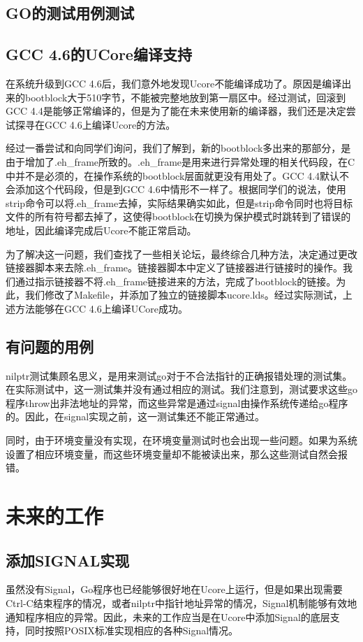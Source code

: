 \documentclass{article}
\begin{document}
\subsection{GO的测试用例测试}

\subsection{GCC 4.6的UCore编译支持}
在系统升级到GCC 4.6后，我们意外地发现Ucore不能编译成功了。原因是编译出来的bootblock大于510字节，不能被完整地放到第一扇区中。经过测试，回滚到GCC 4.4是能够正常编译的，但是为了能在未来使用新的编译器，我们还是决定尝试探寻在GCC 4.6上编译Ucore的方法。

经过一番尝试和向同学们询问，我们了解到，新的bootblock多出来的那部分，是由于增加了.eh\_frame所致的。.eh\_frame是用来进行异常处理的相关代码段，在C中并不是必须的，在操作系统的bootblock层面就更没有用处了。GCC 4.4默认不会添加这个代码段，但是到GCC 4.6中情形不一样了。根据同学们的说法，使用strip命令可以将.eh\_frame去掉，实际结果确实如此，但是strip命令同时也将目标文件的所有符号都去掉了，这使得bootblock在切换为保护模式时跳转到了错误的地址，因此编译完成后Ucore不能正常启动。

为了解决这一问题，我们查找了一些相关论坛，最终综合几种方法，决定通过更改链接器脚本来去除.eh\_frame。链接器脚本中定义了链接器进行链接时的操作。我们通过指示链接器不将.eh\_frame链接进来的方法，完成了bootblock的链接。为此，我们修改了Makefile，并添加了独立的链接脚本ucore.lds。经过实际测试，上述方法能够在GCC 4.6上编译UCore成功。

\subsection{有问题的用例}
nilptr测试集顾名思义，是用来测试go对于不合法指针的正确报错处理的测试集。在实际测试中，这一测试集并没有通过相应的测试。我们注意到，测试要求这些go程序throw出非法地址的异常，而这些异常是通过signal由操作系统传递给go程序的。因此，在signal实现之前，这一测试集还不能正常通过。

同时，由于环境变量没有实现，在环境变量测试时也会出现一些问题。如果为系统设置了相应环境变量，而这些环境变量却不能被读出来，那么这些测试自然会报错。

\section{未来的工作}

\subsection{添加SIGNAL实现}
虽然没有Signal，Go程序也已经能够很好地在Ucore上运行，但是如果出现需要Ctrl-C结束程序的情况，或者nilptr中指针地址异常的情况，Signal机制能够有效地通知程序相应的异常。因此，未来的工作应当是在Ucore中添加Signal的底层支持，同时按照POSIX标准实现相应的各种Signal情况。
\end{document}
